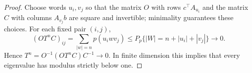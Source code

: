 \begin{proof}
Choose words $u_i,v_j$ so that the matrix $O$ with rows
$c^\top A_{u_i}$ and the matrix $C$ with columns $A_{v_j}b$ are
square and invertible; minimality guarantees these choices. For each
fixed pair $(i,j)$,
\[
 (OT^nC)_{ij}=\sum_{|w|=n}p(u_iwv_j)
 \le P_p\{|W|=n+|u_i|+|v_j|\}\longrightarrow0.
\]
Hence $T^n=O^{-1}(OT^nC)C^{-1}\to0$. In finite dimension this
implies that every eigenvalue has modulus strictly below one.
\end{proof}
